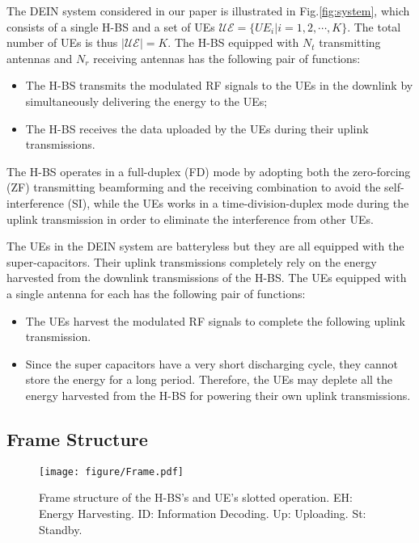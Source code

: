 \documentclass[12pt,draft,onecolumn,journal]{IEEEtran}
\begin{document}
The DEIN system considered in our paper is illustrated in Fig.\ref{fig:system}, which consists of a single H-BS and a set of UEs $\mathcal{UE}=\{UE_i | i =1,2,\cdots, K\}$. The total number of UEs is thus $|\mathcal{UE}| = K$. The H-BS equipped with $N_t$ transmitting antennas and $N_r$ receiving antennas has the following pair of functions:
\begin{itemize}
	\item The H-BS transmits the modulated RF signals to the UEs in the downlink by simultaneously delivering the energy to the UEs;
	\item The H-BS receives the data uploaded by the UEs during their uplink transmissions.
\end{itemize}
The H-BS operates in a full-duplex (FD) mode by adopting both the zero-forcing (ZF) transmitting beamforming and the receiving combination to avoid the self-interference (SI), while the UEs works in a time-division-duplex mode during the uplink transmission in order to eliminate the interference from other UEs. 

The UEs in the DEIN system are batteryless but they are all equipped with the super-capacitors. Their uplink transmissions completely rely on the energy harvested from the downlink transmissions of the H-BS. The UEs equipped with a single antenna for each has the following pair of functions:
\begin{itemize}
	\item The UEs harvest the modulated RF signals to complete the following uplink transmission. 
	\item Since the super capacitors have a very short discharging cycle, they cannot store the energy for a long period. Therefore, the UEs may deplete all the energy harvested from the H-BS for powering their own uplink transmissions.
\end{itemize}


\subsection{Frame Structure}


\begin{figure}
\centering
\texttt{[image: figure/Frame.pdf]}
\setlength{\abovecaptionskip}{0pt}
\setlength{\belowcaptionskip}{0pt} \caption{Frame structure of the H-BS's and UE's slotted operation. EH: Energy Harvesting. ID: Information Decoding. Up: Uploading. St: Standby.} \label{fig:Frame}
\end{figure}
\end{document}
